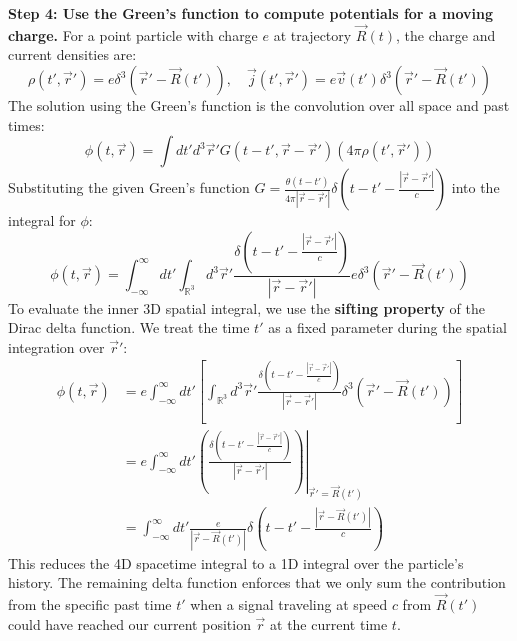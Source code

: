 \begin{solution}
\textbf{Step 4: Use the Green's function to compute potentials for a moving charge.}
For a point particle with charge $e$ at trajectory $\vec{R}(t)$, the charge and current densities are:
\begin{equation*}
    \rho(t', \vec{r}') = e \delta^3(\vec{r}' - \vec{R}(t')), \quad \vec{j}(t', \vec{r}') = e \vec{v}(t') \delta^3(\vec{r}' - \vec{R}(t'))
\end{equation*}
The solution using the Green's function is the convolution over all space and past times:
\begin{equation*}
    \phi(t, \vec{r}) = \int dt' d^3\vec{r}' G(t-t', \vec{r}-\vec{r}') (4\pi \rho(t', \vec{r}'))
\end{equation*}
Substituting the given Green's function $G = \frac{\theta(t-t')}{4\pi|\vec{r}-\vec{r}'|} \delta\left(t-t' - \frac{|\vec{r}-\vec{r}'|}{c}\right)$ into the integral for $\phi$:
\begin{equation*}
    \phi(t, \vec{r}) = \int_{-\infty}^{\infty} dt' \int_{\mathbb{R}^3} d^3\vec{r}' \frac{\delta\left(t-t' - \frac{|\vec{r}-\vec{r}'|}{c}\right)}{|\vec{r}-\vec{r}'|} e \delta^3(\vec{r}' - \vec{R}(t'))
\end{equation*}
To evaluate the inner 3D spatial integral, we use the \textbf{sifting property} of the Dirac delta function. We treat the time $t'$ as a fixed parameter during the spatial integration over $\vec{r}'$:
\begin{align*}
    \phi(t, \vec{r}) &= e \int_{-\infty}^{\infty} dt' \left[ \int_{\mathbb{R}^3} d^3\vec{r}' \frac{\delta\left(t-t' - \frac{|\vec{r}-\vec{r}'|}{c}\right)}{|\vec{r}-\vec{r}'|} \delta^3(\vec{r}' - \vec{R}(t')) \right] \\
    &= e \int_{-\infty}^{\infty} dt' \left. \left( \frac{\delta\left(t-t' - \frac{|\vec{r}-\vec{r}'|}{c}\right)}{|\vec{r}-\vec{r}'|} \right) \right|_{\vec{r}' = \vec{R}(t')} \\
    &= \int_{-\infty}^{\infty} dt' \frac{e}{|\vec{r}-\vec{R}(t')|} \delta\left(t-t' - \frac{|\vec{r}-\vec{R}(t')|}{c}\right)
\end{align*}
This reduces the 4D spacetime integral to a 1D integral over the particle's history. The remaining delta function enforces that we only sum the contribution from the specific past time $t'$ when a signal traveling at speed $c$ from $\vec{R}(t')$ could have reached our current position $\vec{r}$ at the current time $t$.

\end{solution}

